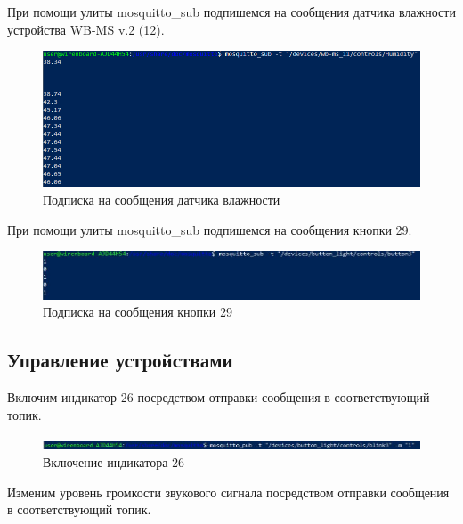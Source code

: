 \documentclass[a4paper,14pt]{extarticle}
\begin{document}
При помощи улиты mosquitto\_sub подпишемся на сообщения датчика влажности устройства WB-MS v.2 (12).
\newpage
\begin{figure}[htpb]
	\centering
	\includegraphics[width=0.9\linewidth]{images/ssh-powershell2}
	\caption{Подписка на сообщения датчика влажности}
	\label{fig:ssh-powershell2}
\end{figure}
При помощи улиты mosquitto\_sub подпишемся на сообщения кнопки 29.
\begin{figure}[htpb]
	\centering
	\includegraphics[width=0.9\linewidth]{images/ssh-powershell2.1}
	\caption{Подписка на сообщения кнопки 29}
	\label{fig:ssh-powershell2.1}
\end{figure}

\subsection{Управление устройствами}

Включим индикатор 26 посредством отправки сообщения в
соответствующий топик.
\begin{figure}[htpb]
	\centering
	\includegraphics[width=1\linewidth]{images/ssh-powershell3.1}
	\caption{Включение индикатора 26}
	\label{fig:ssh-powershell3.1}
\end{figure}

\newpage
Изменим уровень громкости звукового сигнала посредством отправки сообщения в
соответствующий топик.
\end{document}
